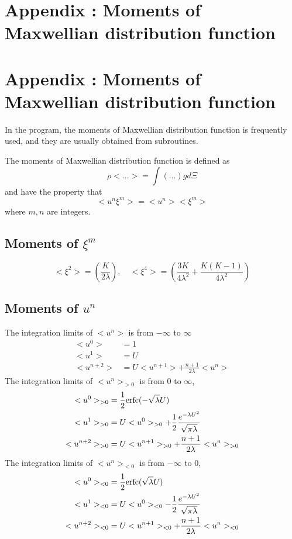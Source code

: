 \documentclass[a4paper]{book}
\makeatletter
\newcommand{\appxchapter}[2][\@empty]{
    \ifx\@empty#1
    \chapter{Appendix \Alph{chapter}: #2}
    \else
    \chapter[#1]{Appendix \Alph{chapter}: #2}
    \fi
}
\makeatother
\begin{document}
\backmatter


\begin{appendices}
    \setcounter{chapter}{1}

    \appxchapter{Moments of Maxwellian distribution function}
    \label{appendix:moments}
    In the program, the moments of Maxwellian distribution function is frequently used, and they are usually obtained from subroutines.

    The moments of Maxwellian distribution function is defined as
    $$\rho<...>=\int(...)gd\Xi$$
    and have the property that
    $$<u^n \xi^m> = <u^n><\xi^m>$$
    where $m,n$ are integers.

    \section*{Moments of $\xi^m$}
    $$<\xi^2>=\left(\frac{K}{2\lambda}\right),\quad <\xi^4>=\left(\frac{3K}{4\lambda^2}+\frac{K(K-1)}{4\lambda^2}\right)$$

    \section*{Moments of $u^n$}
    The integration limits of $<u^n>$ is from $-\infty$ to $\infty$
    $$
    \begin{aligned}
        <u^0> &= 1\\
        <u^1> &= U\\
        <u^{n+2}> &= U<u^{n+1}>+\frac{n+1}{2\lambda}<u^n>
    \end{aligned} 
    $$
    The integration limits of $<u^n>_{>0}$ is from $0$ to $\infty$,
    $$
    \begin{aligned}
        <u^0>_{>0} &= \frac{1}{2}{\rm erfc}(-\sqrt{\lambda}U) \\
        <u^1>_{>0} &= U<u^0>_{>0}+\frac{1}{2}\frac{e^{-\lambda U^2}}{\sqrt{\pi\lambda}} \\
        <u^{n+2}>_{>0} &= U<u^{n+1}>_{>0}+\frac{n+1}{2\lambda}<u^n>_{>0}
    \end{aligned} 
    $$
    The integration limits of $<u^n>_{<0}$ is from $-\infty$ to $0$,
    $$
    \begin{aligned}
        <u^0>_{<0} &= \frac{1}{2}{\rm erfc}(\sqrt{\lambda}U) \\
        <u^1>_{<0} &= U<u^0>_{<0}-\frac{1}{2}\frac{e^{-\lambda U^2}}{\sqrt{\pi\lambda}} \\
        <u^{n+2}>_{<0} &= U<u^{n+1}>_{<0}+\frac{n+1}{2\lambda}<u^n>_{<0}
    \end{aligned} 
    $$


\end{appendices}
\end{document}
